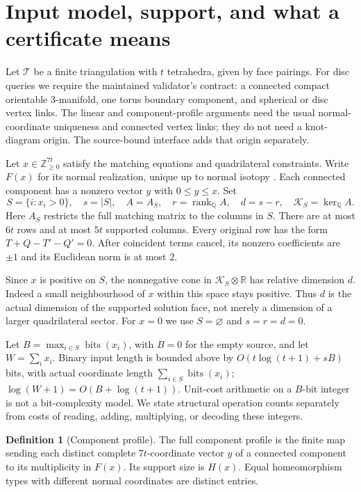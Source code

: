 \documentclass[11pt,a4paper]{article}
\theoremstyle{definition}
\newtheorem{definition}[theorem]{Definition}
\newcommand{\Q}{\mathbb Q}
\newcommand{\Z}{\mathbb Z}
\newcommand{\R}{\mathbb R}
\newcommand{\rank}{\operatorname{rank}}
\newcommand{\bits}{\operatorname{bits}}
\newcommand{\calK}{\mathcal K}
\newcommand{\calT}{\mathcal T}
\begin{document}
\section{Input model, support, and what a certificate means}
\label{sec:model}

Let $\calT$ be a finite triangulation with $t$ tetrahedra, given by face
pairings.  For disc queries we require the maintained validator's contract:
a connected compact orientable $3$-manifold, one torus boundary component,
and spherical or disc vertex links.  The linear and component-profile
arguments need the usual normal-coordinate uniqueness and connected vertex
links; they do not need a knot-diagram origin.  The source-bound interface
adds that origin separately.

Let $x\in\Z_{\ge0}^{7t}$ satisfy the matching equations and quadrilateral
constraints.  Write $F(x)$ for its normal realization, unique up to normal
isotopy \cite[Theorem~5.1]{HLP99}.  Each connected component has a nonzero vector $y$ with
$0\le y\le x$.  Set
\begin{equation}
 S=\{i:x_i>0\},\quad s=|S|,\quad
 A=A_S,\quad r=\rank_{\Q} A,\quad d=s-r,\quad
 \calK_S=\ker_{\Q} A.                         \label{eq:support}
\end{equation}
Here $A_S$ restricts the full matching matrix to the columns in $S$.
There are at most $6t$ rows and at most $5t$ supported columns.  Every original
row has the form $T+Q-T'-Q'=0$.  After coincident terms cancel, its nonzero
coefficients are $\pm1$ and its Euclidean norm is at most $2$.

Since $x$ is positive on $S$, the nonnegative cone in $\calK_S\otimes\R$
has relative dimension $d$.  Indeed a small neighbourhood of $x$ within this
space stays positive.  Thus $d$ is the actual dimension of the supported
solution face, not merely a dimension of a larger quadrilateral sector.
For $x=0$ we use $S=\varnothing$ and $s=r=d=0$.

Let $B=\max_{i\in S}\bits(x_i)$, with $B=0$ for the empty source, and let
$W=\sum_i x_i$.  Binary input length is bounded above by
$O(t\log(t+1)+sB)$ bits, with actual coordinate length
$\sum_{i\in S}\bits(x_i)$;
$\log(W+1)=O(B+\log(t+1))$.  Unit-cost arithmetic on a $B$-bit integer is
not a bit-complexity model.  We state structural operation counts separately
from costs of reading, adding, multiplying, or decoding these integers.

\begin{definition}[Component profile]
The full component profile is the finite map sending each distinct complete
$7t$-coordinate vector $y$ of a connected component to its multiplicity in
$F(x)$.  Its support size is $H(x)$.  Equal homeomorphism types with different
normal coordinates are distinct entries.
\end{definition}
\end{document}

